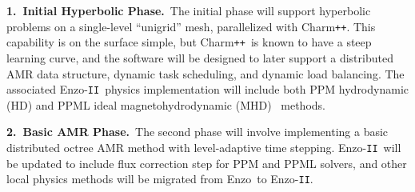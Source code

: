 \documentclass[11pt,letterpaper]{article}
\newcommand{\enzo}{\textsf{Enzo}}
\newcommand{\enzoii}{\textsf{Enzo}-\texttt{II}}
\newcommand{\pp}{\texttt{++}}
\newcommand{\charm}{\textsf{Charm\pp}}
\newcounter{figctr}
\newcommand{\FIGURE}[3]{
\noindent
\parbox{\textwidth}{
\begin{center}
#3
\end{center}%
\ \nolinebreak%
\refstepcounter{figctr}%
\begin{center}%
\begin{minipage}{7.0in}
\textbf{Figure \thefigctr}. #1
\end{minipage}
\end{center}
\label{#2}
}}
\begin{document}
   

\textbf{1.~Initial Hyperbolic Phase.}~The initial phase will support
hyperbolic problems on a single-level ``unigrid'' mesh, parallelized
with \charm.  This capability is on the surface simple, but \charm\ is
known to have a steep learning curve, and the software will be
designed to later support a distributed AMR data structure, dynamic
task scheduling, and dynamic load balancing.  The associated \enzoii\
physics implementation will include both PPM hydrodynamic (HD) and
PPML ideal magnetohydrodynamic (MHD)~\cite{UsPo09} methods.

\textbf{2.~Basic AMR Phase.}~The second phase will involve implementing a
basic distributed octree AMR method with level-adaptive time stepping.
\enzoii\ will be updated to include flux correction step for PPM and
PPML solvers, and other local physics methods will be migrated from
\enzo\ to \enzoii.
\end{document}
